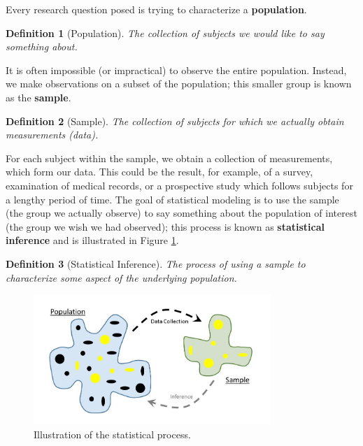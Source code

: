 \documentclass[
]{book}
\theoremstyle{plain}
\theoremstyle{mydefn}
\newtheorem{definition}{Definition}[chapter]
\theoremstyle{myexmpl}
\theoremstyle{remark}
\begin{document}
Every research question posed is trying to characterize a \textbf{population}.

\begin{definition}[Population]
The collection of subjects we would like to say something about.
\end{definition}

It is often impossible (or impractical) to observe the entire population. Instead, we make observations on a subset of the population; this smaller group is known as the \textbf{sample}.

\begin{definition}[Sample]
The collection of subjects for which we actually obtain measurements (data).
\end{definition}

For each subject within the sample, we obtain a collection of measurements, which form our data. This could be the result, for example, of a survey, examination of medical records, or a prospective study which follows subjects for a lengthy period of time. The goal of statistical modeling is to use the sample (the group we actually observe) to say something about the population of interest (the group we wish we had observed); this process is known as \textbf{statistical inference} and is illustrated in Figure \ref{fig:statistical-process-statistical-process}.

\begin{definition}[Statistical Inference]
The process of using a sample to characterize some aspect of the underlying population.
\end{definition}

\begin{figure}

{\centering \includegraphics[width=0.8\textwidth]{images/Statistical-Process-Statistical-Process} 

}

\caption{Illustration of the statistical process.}\label{fig:statistical-process-statistical-process}
\end{figure}
\end{document}
